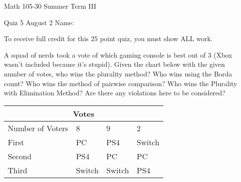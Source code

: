\documentclass[11pt,epsfig]{article}
\begin{document}
Math 105-30 Summer Term III 

Quiz 5 August 2 \hspace{1.9in} {Name:} {\underline {\hspace{3.5in}}}
\vspace{1pc}

To receive full credit for this 25 point quiz, you must show ALL work.
\vspace{1pc}

\begin{problem}{25}
A squad of nerds took a vote of which gaming console is best out of 3 (Xbox wasn't included because it's stupid). Given the chart below with the given number of votes, who wins the plurality method? Who wins using the Borda count? Who wins the method of pairwise comparison? Who wins the Plurality with Elimination Method? Are there any violations here to be considered?

\begin{tabular}{ |p{3cm}||p{3cm}|p{3cm}|p{3cm}|  }
 \hline
 \multicolumn{4}{|c|}{Votes} \\
 \hline
 Number of Voters &8&9&2\\
 \hline
 First   &    PC      &PS4    &  Switch\\
 Second&  PS4    & PC      &  PC\\
 Third &    Switch &Switch&  PS4\\
 \hline
\end{tabular}

\vfill
\end{problem}





\showpoints
\end{document}
